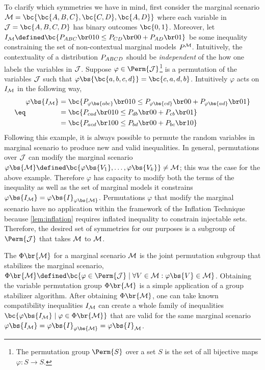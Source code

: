 \documentclass[aps, 10pt, english, twoside, pra, nofootinbib, tightenlines, longbibliography, superscriptaddress]{revtex4-1}
\begin{document}
    To clarify which symmetries we have in mind, first consider the marginal scenario $\mscenario = \bc{\bc{A, B, C}, \bc{C, D}, \bc{A, D}}$ where each variable in $\jointvar = \bc{A,B,C,D}$ has binary outcomes $\bc{0,1}$. Moreover, let $I_{\mscenario} \defined \bc{\prob[ABC][010] \leq \prob[CD][00] + \prob[AD][01]}$ be some inequality constraining the set of non-contextual marginal models $\prob^{\mscenario}$. Intuitively, the contextuality of a distribution $\prob[ABCD]$ should be \textit{independent} of the how one labels the variables in $\mathcal{J}$. Suppose $\varphi \in \Perm{\jointvar}$\footnote{The permutation group $\Perm{S}$ over a set $S$ is the set of all bijective maps $\varphi : S \to S$.} is a permutation of the variables $\mathcal{J}$ such that $\varphi\bs{\bc{a,b,c,d}} = \bc{c,a,d,b}$. Intuitively $\varphi$ acts on $I_{\mathcal{M}}$ in the following way,
    \begin{align*}
    \eq \label{eq:symmetry_example}
    \begin{split}
        \varphi\bs{I_{\mscenario}} &= \bc{\prob[\varphi\bs{abc}][010] \leq \prob[\varphi\bs{cd}][00] + \prob[\varphi\bs{ad}][01]} \\
        &= \bc{\prob[cad][010] \leq \prob[db][00] + \prob[cb][01]} \\
        &= \bc{\prob[acd][100] \leq \prob[bd][00] + \prob[bc][10]}
    \end{split}
    \end{align*}
    Following this example, it is always possible to permute the random variables in marginal scenario to produce new and valid inequalities. In general, permutations over $\mathcal{J}$ can modify the marginal scenario $\varphi\bs{\mscenario} \defined \bc{\varphi\bs{V_1}, \ldots, \varphi\bs{V_k}} \neq \mscenario$; this was the case for the above example. Therefore $\varphi$ has capacity to modify both the terms of the inequality as well as the set of marginal models it constrains $\varphi\bs{I_{\mscenario}} = \varphi\bs{I}_{\varphi\bs{\mscenario}}$. Permutations $\varphi$ that modify the marginal scenario have no application within the framework of the Inflation Technique because \cref{lem:inflation} requires inflated inequality to constrain injectable sets. Therefore, the desired set of symmetries for our purposes is a subgroup of $\Perm{\jointvar}$ that takes $\mathcal{M}$ to $\mathcal{M}$.

    The  $\gp\br{\mscenario}$ for a marginal scenario $\mathcal{M}$ is the joint permutation subgroup that stabilizes the marginal scenario, $\Phi\br{\mscenario} \defined \bc{\varphi \in \Perm{\jointvar} \mid \forall V \in \mscenario : \varphi\bs{V} \in \mscenario}$.
    Obtaining the variable permutation group $\gp\br{\mscenario}$ is a simple application of a group stabilizer algorithm. After obtaining $\gp\br{\mscenario}$, one can take known compatibility inequalities $I_{\mathcal{M}}$ can create a whole family of inequalities $\bc{\varphi\bs{I_{\mscenario}} \mid \varphi \in \gp\br{\mscenario}}$ that are valid for the same marginal scenario $\varphi\bs{I_{\mscenario}} = \varphi\bs{I}_{\varphi\bs{\mscenario}} = \varphi\bs{I}_{\mscenario}$.
\end{document}
